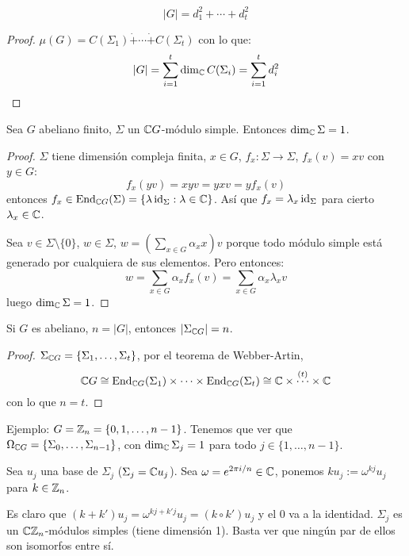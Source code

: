 \begin{cor}
  \[
    |G| = d_1^2+\cdots+d_t^2
  \]
\end{cor}
\begin{proof}
  \(\mu(G)=C(\Sigma_1)\dot{+}\cdots\dot{+}C(\Sigma_t)\) con lo que:
  \[|G|=\sum_{i=1}^t \dim_{\mathbb{C}} C(\Sigma_i)=\sum_{i=1}^t d_i^2\]
\end{proof}

\begin{prop}
  Sea \(G\) abeliano finito, \(\Sigma\) un \(\mathbb{C} G\)-módulo simple.
  Entonces \(\dim_{\mathbb{C}} \Sigma = 1\).
\end{prop}
\begin{proof}
  \(\Sigma\) tiene dimensión compleja finita, \(x\in G\),
  \(f_x:\Sigma\longrightarrow\Sigma\), \(f_x(v)=xv\)
  con \(y\in G\):
  \[
    f_x(yv)=xyv=yxv=yf_x(v)
  \]
  entonces \(f_x\in\operatorname{End}_{\mathbb{C} G}(\Sigma)=
  \{\lambda\operatorname{id}_\Sigma:\lambda\in\mathbb{C}\}\). Así que \(f_x=\lambda_x\operatorname{id}_\Sigma\)
  para cierto \(\lambda_x\in\mathbb{C}\).

  Sea \(v\in\Sigma\setminus\{0\}\), \(w\in\Sigma\),
  \(w=(\sum_{x\in G} \alpha_x x)v\) porque todo módulo simple está generado
  por cualquiera de sus elementos.
  Pero entonces: \[
    w=\sum_{x\in G} \alpha_x f_x(v)=\sum_{x\in G} \alpha_x\lambda_x v
  \]
  luego \(\dim_{\mathbb{C}} \Sigma = 1\).

\end{proof}

\begin{cor}
  Si \(G\) es abeliano, \(n=|G|\), entonces \(|\Sigma_{\mathbb{C} G}|=n\).
\end{cor}
\begin{proof}
  \(\Sigma_{\mathbb{C} G} =\{\Sigma_1,\ldots,\Sigma_t\}\), por el teorema
  de Webber-Artin,
  \[
    \mathbb{C} G \cong \operatorname{End}_{\mathbb{C} G}(\Sigma_1)\times\cdots\times
    \operatorname{End}_{\mathbb{C} G}(\Sigma_t)
    \cong \mathbb{C}\times\overset{(t)}{\cdots}\times\mathbb{C}
  \]
  con lo que \(n =t\).

\end{proof}

Ejemplo: \(G=\mathbb{Z}_n=\{0,1,\ldots, n-1\}\).
Tenemos que ver que \(\Omega_{\mathbb{C} G}=\{\Sigma_0,\ldots,\Sigma_{n-1}\}\), con
\(\dim_{\mathbb{C}} \Sigma_j = 1\) para todo \(j\in\{1,\ldots,n-1\}\).

Sea \(u_j\) una base de \(\Sigma_j\) (\(\Sigma_j =\mathbb{C} u_j\)).
Sea \(\omega =e^{2\pi i/n}\in\mathbb{C}\), ponemos \(k u_j :=\omega^{kj} u_j\) para
\(k\in\mathbb{Z}_n\).

Es claro que \((k+k')u_j=\omega^{kj+k'j}u_j=(k\circ k')u_j\) y el 0 va a la
identidad. \(\Sigma_j\) es un \(\mathbb{C} \mathbb{Z}_n\)-módulos simples (tiene
dimensión 1). Basta ver que ningún par de ellos son isomorfos entre sí.

